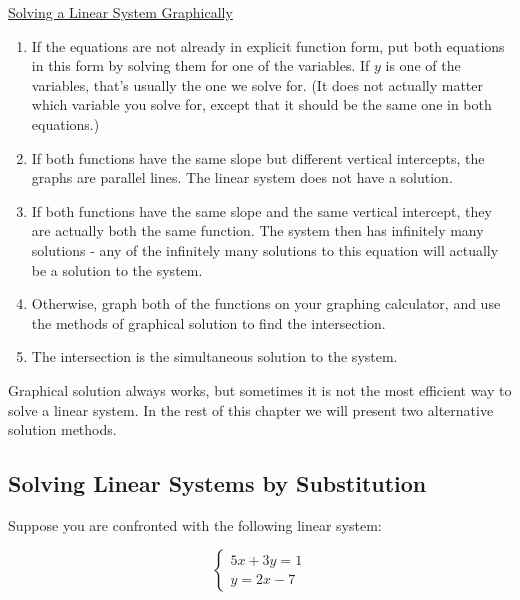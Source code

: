 \begin{definition}
	\underline{Solving a Linear System Graphically}\\
	\bigskip
	\begin{enumerate}
		\item If the equations are not already in explicit function form, put both equations in this form by solving them for one of the variables. If $y$ is one of the variables, that’s usually the one we solve for. (It does not actually matter which variable you solve for, except that it should be the same one in both equations.)
		\item If both functions have the same slope but different vertical intercepts, the graphs are parallel 	lines. The linear system does not have a solution.
		\item If both functions have the same slope and the same vertical intercept, they are actually both the same function. The system then has infinitely many solutions - any of the infinitely many
		solutions to this equation will actually be a solution to the system.
		\item Otherwise, graph both of the functions on your graphing calculator, and use the methods of graphical solution to find the intersection.
		\item The intersection is the simultaneous solution to the system.
	\end{enumerate}
\end{definition}

Graphical solution always works, but sometimes it is not the most efficient way to solve a linear system. In the rest of this chapter we will present two alternative solution methods.

%
%

\subsection{Solving Linear Systems by Substitution}

Suppose you are confronted with the following linear system:

$$\begin{cases} 5x+3y=1\\y=2x-7 \end{cases}$$

